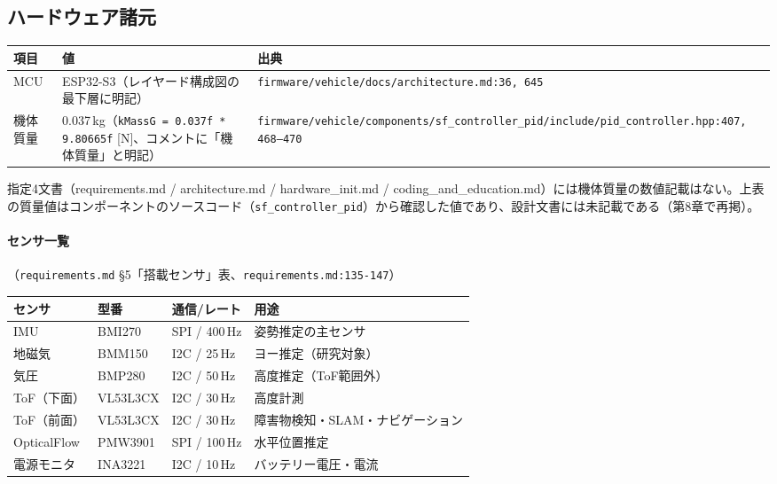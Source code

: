 \documentclass[a4paper,10pt]{ltjsarticle}
\begin{document}
\subsection{ハードウェア諸元}

\begin{table}[h]
\centering\footnotesize
\begin{tabularx}{\textwidth}{@{}lYl@{}}
\toprule
項目 & 値 & 出典 \\
\midrule
MCU & ESP32-S3（レイヤード構成図の最下層に明記） & \texttt{firmware/vehicle/docs/architecture.md:36, 645} \\
機体質量 & 0.037\,kg（\texttt{kMassG = 0.037f * 9.80665f} [N]、コメントに「機体質量」と明記） & \texttt{firmware/vehicle/components/sf\_controller\_pid/include/pid\_controller.hpp:407, 468--470} \\
\bottomrule
\end{tabularx}
\end{table}

指定4文書（requirements.md / architecture.md / hardware\_init.md / coding\_and\_education.md）には機体質量の数値記載はない。上表の質量値はコンポーネントのソースコード（\texttt{sf\_controller\_pid}）から確認した値であり、設計文書には未記載である（第8章で再掲）。

\paragraph{センサ一覧}（\texttt{requirements.md} §5「搭載センサ」表、\texttt{requirements.md:135-147}）

\begin{table}[h]
\centering\footnotesize
\begin{tabularx}{\textwidth}{@{}lllY@{}}
\toprule
センサ & 型番 & 通信/レート & 用途 \\
\midrule
IMU & BMI270 & SPI / 400\,Hz & 姿勢推定の主センサ \\
地磁気 & BMM150 & I2C / 25\,Hz & ヨー推定（研究対象） \\
気圧 & BMP280 & I2C / 50\,Hz & 高度推定（ToF範囲外） \\
ToF（下面） & VL53L3CX & I2C / 30\,Hz & 高度計測 \\
ToF（前面） & VL53L3CX & I2C / 30\,Hz & 障害物検知・SLAM・ナビゲーション \\
OpticalFlow & PMW3901 & SPI / 100\,Hz & 水平位置推定 \\
電源モニタ & INA3221 & I2C / 10\,Hz & バッテリー電圧・電流 \\
\bottomrule
\end{tabularx}
\end{table}
\end{document}
